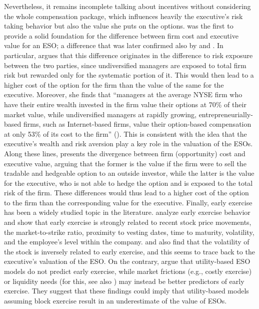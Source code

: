     Nevertheless, it remains incomplete talking about incentives without considering the whole compensation package, which influences heavily the executive's risk taking behavior but also the value she puts on the options. \cite{carpenter1998exercise} was the first to provide a solid foundation for the difference between firm cost and executive value for an ESO; a difference that was later confirmed also by \cite{meulbroek2001efficiency} and \cite{hall2003trouble}. In particular, \cite{meulbroek2001efficiency} argues that this difference originates in the difference to risk exposure between the two parties, since undiversified managers are exposed to total firm risk but rewarded only for the systematic portion of it. This would then lead to a higher cost of the option for the firm than the value of the same for the executive. Moreover, she finds that ``managers at the average NYSE firm who have their entire wealth invested in the firm value their options at 70\% of their market value, while undiversified managers at rapidly growing, entrepreneurially-based firms, such as Internet-based firms, value their option-based compensation at only 53\% of its cost to the firm'' (\cite{meulbroek2001efficiency}). This is consistent with the idea that the executive's wealth and risk aversion play a key role in the valuation of the ESOs. Along these lines, \cite{hall2002stock} presents the divergence between firm (opportunity) cost and executive value, arguing that the former is the value if the firm were to sell the tradable and hedgeable option to an outside investor, while the latter is the value for the executive, who is not able to hedge the option and is exposed to the total risk of the firm. These differences would thus lead to a higher cost of the option to the firm than the corresponding value for the executive.
    Finally, early exercise has been a widely studied topic in the literature. \cite{huddart1996employee} analyze early exercise behavior and show that early exercise is strongly related to recent stock price movements, the market-to-strike ratio, proximity to vesting dates, time to maturity, volatility, and the employee's level within the company. \cite{heron2017stock} and \cite{izhakian2017risk} also find that the volatility of the stock is inversely related to early exercise, and this seems to trace back to the executive's valuation of the ESO. On the contrary, \cite{grasselli2009risk} argue that utility-based ESO models do not predict early exercise, while market frictions (e.g., costly exercise) or liquidity needs (for this, see also \cite{murphy2019employees}) may instead be better predictors of early exercise. They suggest that these findings could imply that utility-based models assuming block exercise result in an underestimate of the value of ESOs.

